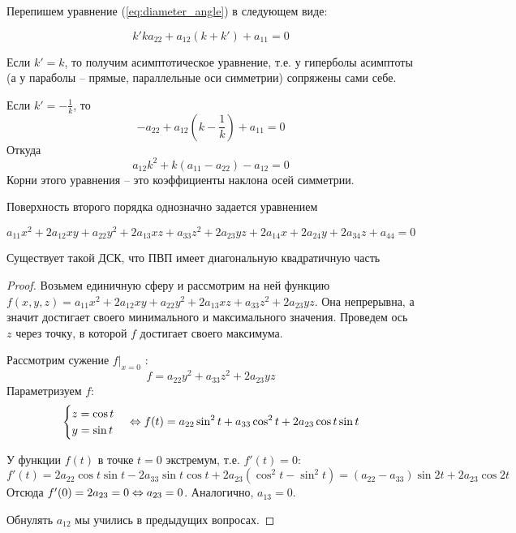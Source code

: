 \begin{Rem}
	Перепишем уравнение (\ref{eq:diameter_angle}) в следующем виде:

	\[k'k a_{22} + a_{12}(k + k') + a_{11} = 0\]	

	\begin{MyItemize}
		\item Если $k' = k$, то получим асимптотическое уравнение, т.е. у гиперболы асимптоты (а у параболы -- прямые, параллельные оси симметрии) сопряжены сами себе.
		\item Если $k' = -\frac{1}{k}$, то
		\[-a_{22} + a_{12} \left(k - \frac{1}{k}\right)+ a_{11} = 0 \]
		Откуда
		\[a_{12} k^2 + k(a_{11} - a_{22}) - a_{12} = 0\]
		Корни этого уравнения -- это коэффициенты наклона осей симметрии.
	\end{MyItemize}
\end{Rem}


Поверхность второго порядка однозначно задается уравнением

\[a_{11} x^2 + 2a_{12} xy + a_{22} y^2 + 2a_{13} xz + a_{33} z^2 + 2a_{23} yz + 2a_{14} x + 2a_{24} y + 2a_{34} z + a_{44} = 0\]

\begin{Thm}
	Существует такой ДСК, что ПВП имеет диагональную квадратичную часть
\end{Thm}

\begin{proof}
	Возьмем единичную сферу и рассмотрим на ней функцию $f(x, y, z) = a_{11} x^2 + 2a_{12} xy + a_{22} y^2 + 2a_{13} xz + a_{33} z^2 + 2a_{23} yz$.
	Она непрерывна, а значит достигает своего минимального и максимального значения. Проведем ось $z$ через точку, в которой $f$ достигает своего максимума.

	Рассмотрим сужение $f|_{x = 0}$ :
	\[f = a_{22} y^2 + a_{33} z^2 + 2a_{23} yz\]
	Параметризуем $f$:
	\[\begin{cases}
		z = \cos t \\
		y = \sin t
	\end{cases} \Leftrightarrow f(t) = a_{22} \sin^2 t + a_{33} \cos^2 t + 2a_{23} \cos t \sin t\]

	У функции $f(t)$ в точке $t = 0$ экстремум, т.е. $f'(t) = 0$:
	\[f'(t) = 2a_{22} \cos t \sin t - 2a_{33} \sin t \cos t + 2a_{23} (\cos^2 t - \sin^2 t) = (a_{22} - a_{33})\sin 2t + 2a_{23} \cos 2t\]
	Отсюда $f'(0) = 2a_{23} = 0 \Leftrightarrow a_{23} = 0$. Аналогично, $a_{13} = 0$.

	Обнулять $a_{12}$ мы учились в предыдущих вопросах.
\end{proof}

